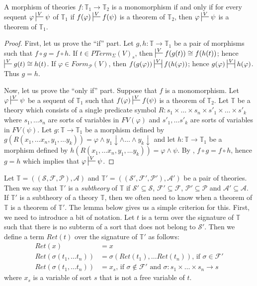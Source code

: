 \documentclass[reqno]{amsart}
\theoremstyle{definition}
\theoremstyle{remark}
\numberwithin{figure}{section}
\begin{document}
\begin{prop}[mono]
A morphism of theories $f : \mathbb{T}_1 \to \mathbb{T}_2$ is a monomorphism if and only if for every sequent $\varphi \sststile{}{V} \psi$ of $\mathbb{T}_1$
if $f(\varphi) \sststile{}{V} f(\psi)$ is a theorem of $\mathbb{T}_2$, then $\varphi \sststile{}{V} \psi$ is a theorem of $\mathbb{T}_1$.
\end{prop}
\begin{proof}
First, let us prove the ``if'' part.
Let $g,h : \mathbb{T} \to \mathbb{T}_1$ be a pair of morphisms such that $f \circ g = f \circ h$.
If $t \in PTerm_\Sigma(V)_s$, then $\sststile{}{V} f(g(t)) \cong f(h(t))$; hence $\sststile{}{V} g(t) \cong h(t)$.
If $\varphi \in Form_\mathcal{P}(V)$, then $f(g(\varphi)) \ssststile{}{V} f(h(\varphi))$; hence $g(\varphi) \ssststile{}{V} h(\varphi)$.
Thus $g = h$.

Now, let us prove the ``only if'' part.
Suppose that $f$ is a monomorphism.
Let $\varphi \sststile{}{V} \psi$ be a sequent of $\mathbb{T}_1$ such that $f(\varphi) \sststile{}{V} f(\psi)$ is a theorem of $\mathbb{T}_2$.
Let $\mathbb{T}$ be a theory which consists of a single predicate symbol $R : s_1 \times \ldots \times s_n \times s'_1 \times \ldots \times s'_k$
where $s_1, \ldots s_n$ are sorts of variables in $FV(\varphi)$ and $s'_1, \ldots s'_k$ are sorts of variables in $FV(\psi)$.
Let $g : \mathbb{T} \to \mathbb{T}_1$ be a morphism defined by $g(R(x_1, \ldots x_n, y_1, \ldots y_k)) = \varphi \land y_1\!\downarrow \land \ldots \land y_k\!\downarrow$ and
let $h : \mathbb{T} \to \mathbb{T}_1$ be a morphism defined by $h(R(x_1, \ldots x_n, y_1, \ldots y_k)) = \varphi \land \psi$.
By , $f \circ g = f \circ h$, hence $g = h$ which implies that $\varphi \sststile{}{V} \psi$.
\end{proof}

Let $\mathbb{T} = ((\mathcal{S},\mathcal{F},\mathcal{P}),\mathcal{A})$ and $\mathbb{T}' = ((\mathcal{S}',\mathcal{F}',\mathcal{P}'),\mathcal{A}')$ be a pair of theories.
Then we say that $\mathbb{T}'$ is a \emph{subtheory} of $\mathbb{T}$ if $\mathcal{S}' \subseteq \mathcal{S}$, $\mathcal{F}' \subseteq \mathcal{F}$, $\mathcal{P}' \subseteq \mathcal{P}$ and $\mathcal{A}' \subseteq \mathcal{A}$.
If $\mathbb{T}'$ is a subtheory of a theory $\mathbb{T}$, then we often need to know when a theorem of $\mathbb{T}$ is a theorem of $\mathbb{T}'$.
The lemma below gives us a simple criterion for this.
First, we need to introduce a bit of notation.
Let $t$ is a term over the signature of $\mathbb{T}$ such that there is no subterm of a sort that does not belong to $\mathcal{S}'$.
Then we define a term $Ret(t)$ over the signature of $\mathbb{T}'$ as follows:
\begin{align*}
Ret(x) & = x \\
Ret(\sigma(t_1, \ldots t_n)) & = \sigma(Ret(t_1), \ldots Ret(t_n)) \text{, if $\sigma \in \mathcal{F}'$} \\
Ret(\sigma(t_1, \ldots t_n)) & = x_s \text{, if $\sigma \notin \mathcal{F}'$ and $\sigma : s_1 \times \ldots \times s_n \to s$}
\end{align*}
where $x_s$ is a variable of sort $s$ that is not a free variable of $t$.
\end{document}
